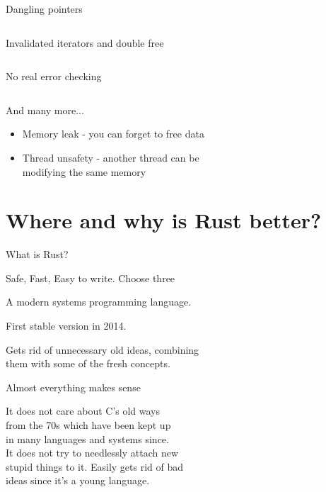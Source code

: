 \documentclass[usenames,dvipsnames,10pt,aspectratio=169]{beamer}
\begin{document}
\begin{frame}{Dangling pointers} 
	\inputminted[fontsize=\large]{c}{code/danp.c}
\end{frame}

\begin{frame}{Invalidated iterators and double free} 
	\inputminted[fontsize=\large]{c}{code/iter.c}
\end{frame}

\begin{frame}{No real error checking} 
	\inputminted[fontsize=\large]{c}{code/errorcheck.c}
\end{frame}

\begin{frame}{And many more...}
	\Large
	\begin{itemize}[label=$\bullet$]
		\item Memory leak - you can forget to free data
		\item Thread unsafety - another thread can be \\
			modifying the same memory
	\end{itemize}
\end{frame}



\section{Where and why is Rust better?}

\begin{frame}{What is Rust?}

\LARGE{\textcolor{ucuyellow}{Safe, Fast, Easy to write. Choose three}}

\vspace{0.8cm}
\large
A modern systems programming language.

\vspace{0.3cm}

First stable version in 2014.\\

\vspace{0.3cm}

Gets rid of unnecessary old ideas, combining \\
them with some of the fresh concepts.
\end{frame}

\begin{frame}{Almost everything makes sense} 

\large
It does not care about C’s old ways\\ 
from the 70s which have been kept up \\
in many languages and systems since.\\ 

\vspace{0.3cm}
It does not try to needlessly attach new\\ 
stupid things to it. Easily gets rid of bad\\ 
ideas since it’s a young language.\\
\end{frame}
\end{document}
